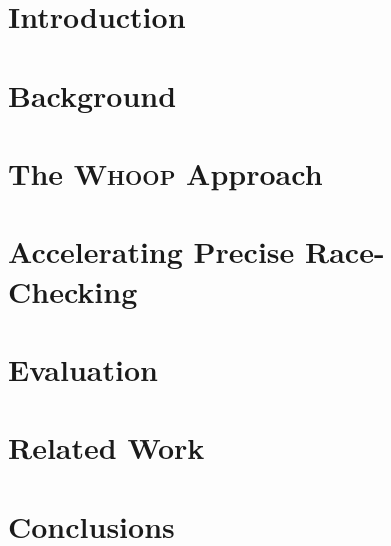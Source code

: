 \documentclass[conference]{IEEEtran}
\newcommand{\whoop}{\textsc{Whoop}\xspace}
\begin{document}

%
\IEEEpeerreviewmaketitle

\section{Introduction}



\section{Background}



\section{The \whoop Approach}
\label{whoop}



\section{Accelerating Precise Race-Checking}
\label{corral}



\section{Evaluation}
\label{evaluation}



\section{Related Work}
\label{related}



\section{Conclusions}



\newpage
\end{document}
